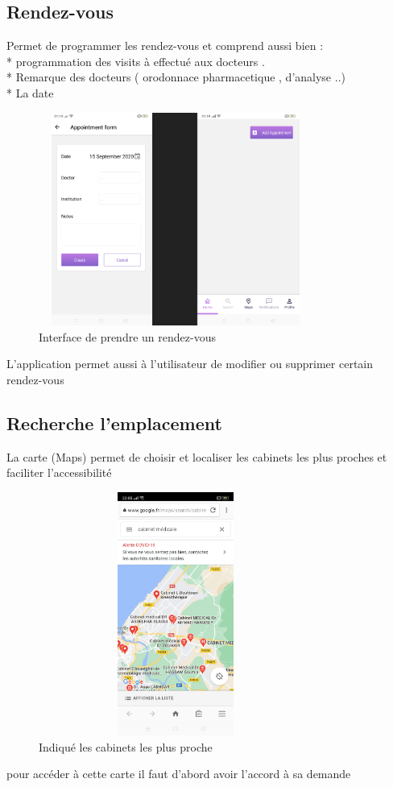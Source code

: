 \subsection{Rendez-vous}
Permet de programmer les rendez-vous et comprend aussi bien :\\
* programmation des visits à effectué aux docteurs .\\
* Remarque des docteurs ( orodonnace pharmacetique , d'analyse ..)\\
* La date 
\begin{figure}[H]
  \centering
\includegraphics[width=9cm,height=7cm,keepaspectratio]{Application/app0.png} 
\caption{Interface de prendre un rendez-vous}
\end{figure}
L'application permet aussi à l'utilisateur de modifier ou supprimer certain rendez-vous
\subsection{Recherche l’emplacement}
La carte (Maps) permet de choisir et localiser les cabinets les plus proches et faciliter l'accessibilité

\begin{figure}[H]
  \centering
\includegraphics[width=9cm,height=8cm,keepaspectratio]{Application/map.png} 
\caption{Indiqué les  cabinets les plus proche}
\end{figure}
pour accéder à cette carte il faut d'abord avoir l'accord à sa demande

